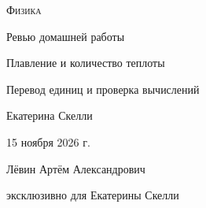 \documentclass[a4paper,11pt]{article}
\begin{document}
\thispagestyle{empty}
\begin{center}
\vspace*{28mm}
{\small\color{accent}\textsc{Физика}}\par
\vspace{17mm}
{\Huge Ревью домашней работы}\par
\vspace{10mm}
{\Large\color{accent} Плавление и количество теплоты}\par
\vspace{8mm}
{\large Перевод единиц и проверка вычислений}\par
\vfill
{\Large Екатерина Скелли}\par
\vspace{12mm}
15 ноября 2026 г.\par
\vspace{17mm}
{\small Лёвин Артём Александрович}\par
{\small эксклюзивно для Екатерины Скелли}\par
\vspace{16mm}
\end{center}
\clearpage
\end{document}
